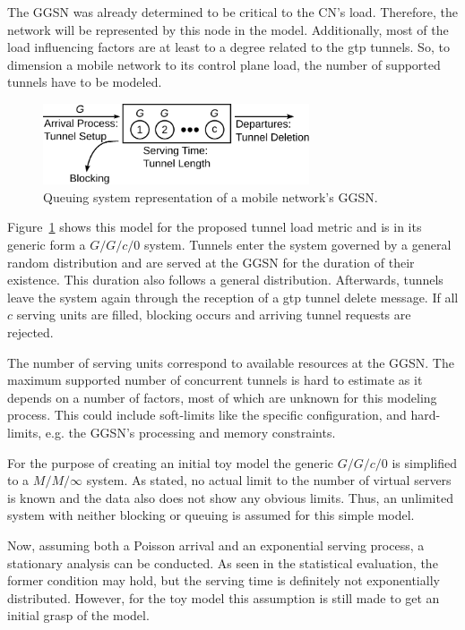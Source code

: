 The \gls{GGSN} was already determined to be critical to the \gls{CN}'s load. Therefore, the network will be represented by this node in the model. Additionally, most of the load influencing factors are at least to a degree related to the \gls{gtp} tunnels. So, to dimension a mobile network to its control plane load, the number of supported tunnels have to be modeled. 


\begin{figure}[htb]
	\centering
	\includegraphics[width=0.7\textwidth]{images/GGn-model.pdf}
	\caption{Queuing system representation of a mobile network's \gls{GGSN}.}
\label{c4:fig:ggn-model}
\end{figure}


Figure~\ref{c4:fig:ggn-model} shows this model for the proposed tunnel load metric and is in its generic form a $G/G/c/0$ system. Tunnels enter the system governed by a general random distribution and are served at the \gls{GGSN} for the duration of their existence. This duration also follows a general distribution. Afterwards, tunnels leave the system again through the reception of a \gls{gtp} tunnel delete message. If all $c$ serving units are filled, blocking occurs and arriving tunnel requests are rejected.

The number of serving units correspond to available resources at the \gls{GGSN}. The maximum supported number of concurrent tunnels is hard to estimate as it depends on a number of factors, most of which are unknown for this modeling process. This could include soft-limits like the specific configuration, and hard-limits, e.g. the \gls{GGSN}'s processing and memory constraints. 

For the purpose of creating an initial toy model the generic $G/G/c/0$ is simplified to a $M/M/\infty$ system. As stated, no actual limit to the number of virtual servers is known and the data also does not show any obvious limits. Thus, an unlimited system with neither blocking or queuing is assumed for this simple model.

Now, assuming both a Poisson arrival and an exponential serving process, a stationary analysis can be conducted. As seen in the statistical evaluation, the former condition may hold, but the serving time is definitely not exponentially distributed. However, for the toy model this assumption is still made to get an initial grasp of the model.

